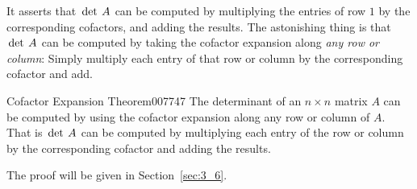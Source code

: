 It asserts that $\thinspace\operatorname{det \medspace} A$ can be computed by multiplying the entries of row $1$ by the corresponding 
cofactors, and adding the results. The astonishing thing is that $\thinspace\operatorname{det \medspace} A$ can be computed by taking the cofactor expansion along \textit{any row or column}: Simply multiply each entry of that row or column by the corresponding cofactor and add.


\begin{theorem}{Cofactor Expansion Theorem\footnotemark}{007747}
The determinant of an $n \times n$ matrix $A$
 can be computed by using the cofactor expansion along any row or column
 of $A$. That is $\thinspace\operatorname{det \medspace} A$ can be computed by multiplying each entry of the 
row or column by the corresponding cofactor and adding the results. 
\end{theorem}

The proof will be given in Section~\ref{sec:3_6}.

